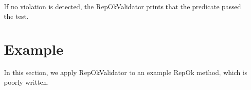 \para If no violation is detected, the RepOkValidator prints that the
predicate passed the test.

\section{Example}
\label{sec:static-analysis-example}
In this section, we apply RepOkValidator to an example RepOk method,
which is poorly-written.

\begin{comment}
we will be discussing the shortcomings of two
\emph{RepOk} methods written for the BinaryTree class shown in
Figure~\ref{fig:btreeDirectRepOk} in
Chapter~\ref{ch:shortcomings-of-korat}. 

The first example will see a faulty \emph{RepOk} implementation that
may affect the valid structures output by the Korat search as it
violates one or more of conditions C1-C3. The second example will see
an inefficient \emph{RepOk} implementation that may affect the
efficiency of the Korat search as it violates one or more of
conditions C4-C6. We will also see the violation logs output by the
RepOkValidator for both the examples.


\subsection{Faulty predicate}
\label{sec:faulty-predicate}
Figure~\ref{fig:repOkKoratSatisfyCorrectness} shows a \emph{RepOk}
implementation that a user may write to generate non-isomorphic
BinaryTree structures. The \emph{RepOk} method may affect output of
Korat as it violates the conditions that need to be fulfilled for
Korat to generate the expected valid structures. To be specific, the
\emph{RepOk} implementation violates condition C3 from
Section~\ref{sec:static-analysis-conditions}. It violates C3 by using
the \texttt{MAX\_SCOPE\_PARAM} field from the \emph{Settings} class
(shown in Figure~\ref{fig:repOkKoratSatisfyCorrectness}). The
\texttt{MAX\_SCOPE\_PARAM} field may be changed during the Korat search
and this might make the Korat search output lesser number of valid
structures than expected.

\begin{figure}
\centering
\begin{lstlisting}[language=Java]
public class Settings {
    public static int MAX_SCOPE_PARAM = 3;
}


\end{comment}
